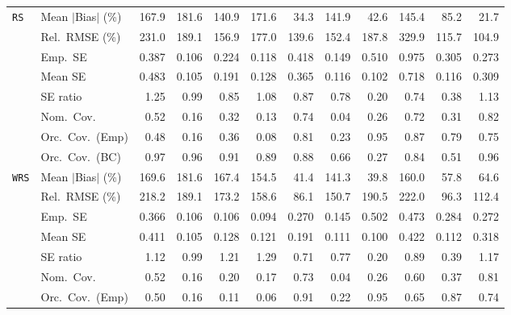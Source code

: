 \begin{landscape}
\begin{longtable}{llrrrrrrrrrr}
\addlinespace[2pt]
\quad \texttt{RS} & Mean $|$Bias$|$ (\%) & 167.9 & 181.6 & 140.9 & 171.6 & \cellcolor{ranktwo}34.3 & 141.9 & \cellcolor{rankthree}42.6 & 145.4 & 85.2 & \cellcolor{rankone}21.7 \\
 & Rel.\ RMSE (\%) & 231.0 & 189.1 & 156.9 & 177.0 & \cellcolor{rankthree}139.6 & 152.4 & 187.8 & 329.9 & \cellcolor{ranktwo}115.7 & \cellcolor{rankone}104.9 \\
 & Emp.\ SE & 0.387 & 0.106 & 0.224 & 0.118 & 0.418 & 0.149 & 0.510 & 0.975 & 0.305 & 0.273 \\
 & Mean SE & 0.483 & 0.105 & 0.191 & 0.128 & 0.365 & 0.116 & 0.102 & 0.718 & 0.116 & 0.309 \\
 & SE ratio & 1.25 & \cellcolor{rankone}0.99 & 0.85 & \cellcolor{ranktwo}1.08 & \cellcolor{rankthree}0.87 & 0.78 & 0.20 & 0.74 & 0.38 & 1.13 \\
 & Nom.\ Cov. & 0.52 & 0.16 & 0.32 & 0.13 & \cellcolor{ranktwo}0.74 & 0.04 & 0.26 & \cellcolor{rankthree}0.72 & 0.31 & \cellcolor{rankone}0.82 \\
 & Orc.\ Cov.\ (Emp) & 0.48 & 0.16 & 0.36 & 0.08 & \cellcolor{rankthree}0.81 & 0.23 & \cellcolor{rankone}0.95 & \cellcolor{ranktwo}0.87 & 0.79 & 0.75 \\
 & Orc.\ Cov.\ (BC) & \cellcolor{rankthree}0.97 & \cellcolor{rankone}0.96 & 0.91 & 0.89 & 0.88 & 0.66 & 0.27 & 0.84 & 0.51 & \cellcolor{ranktwo}0.96 \\
\addlinespace[2pt]
\quad \texttt{WRS} & Mean $|$Bias$|$ (\%) & 169.6 & 181.6 & 167.4 & 154.5 & \cellcolor{ranktwo}41.4 & 141.3 & \cellcolor{rankone}39.8 & 160.0 & \cellcolor{rankthree}57.8 & 64.6 \\
 & Rel.\ RMSE (\%) & 218.2 & 189.1 & 173.2 & 158.6 & \cellcolor{rankone}86.1 & 150.7 & 190.5 & 222.0 & \cellcolor{ranktwo}96.3 & \cellcolor{rankthree}112.4 \\
 & Emp.\ SE & 0.366 & 0.106 & 0.106 & 0.094 & 0.270 & 0.145 & 0.502 & 0.473 & 0.284 & 0.272 \\
 & Mean SE & 0.411 & 0.105 & 0.128 & 0.121 & 0.191 & 0.111 & 0.100 & 0.422 & 0.112 & 0.318 \\
 & SE ratio & \cellcolor{rankthree}1.12 & \cellcolor{rankone}0.99 & 1.21 & 1.29 & 0.71 & 0.77 & 0.20 & \cellcolor{ranktwo}0.89 & 0.39 & 1.17 \\
 & Nom.\ Cov. & 0.52 & 0.16 & 0.20 & 0.17 & \cellcolor{ranktwo}0.73 & 0.04 & 0.26 & \cellcolor{rankthree}0.60 & 0.37 & \cellcolor{rankone}0.81 \\
 & Orc.\ Cov.\ (Emp) & 0.50 & 0.16 & 0.11 & 0.06 & \cellcolor{ranktwo}0.91 & 0.22 & \cellcolor{rankone}0.95 & 0.65 & \cellcolor{rankthree}0.87 & 0.74 \\

\end{longtable}
\end{landscape}
